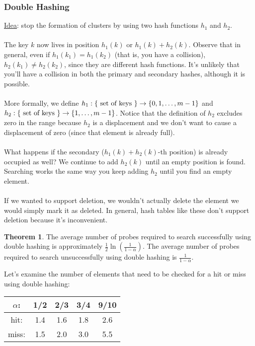 \documentclass[]{article}
\theoremstyle{definition}
\newtheorem*{theorem}{Theorem}
\DeclarePairedDelimiter{\set}{\lbrace}{\rbrace}
\begin{document}
			\subsubsection{Double Hashing}
				\underline{Idea}: stop the formation of clusters by using two hash functions $h_1$ and $h_2$.
				\\ \\
				The key $k$ now lives in position $h_1(k)$ or $h_1(k) + h_2(k)$. Observe that in general, even if $h_1(k_1) = h_1(k_2)$ (that is, you have a collision), $h_2(k_1) \ne h_2(k_2)$, since they are different hash functions. It's unlikely that you'll have a collision in both the primary and secondary hashes, although it is possible.
				\\ \\
				More formally, we define $h_1: \set{\text{ set of keys }} \to \set{0, 1, \ldots, m - 1}$ and $h_2: \set{\text{ set of keys }} \to \set{1, \ldots, m - 1}$. Notice that the definition of $h_2$ excludes zero in the range because $h_2$ is a displacement and we don't want to cause a displacement of zero (since that element is already full).
				\\ \\
				What happens if the secondary ($h_1(k) + h_2(k)$-th position) is already occupied as well? We continue to add $h_2(k)$ until an empty position is found. Searching works the same way \textendash{} you keep adding $h_2$ until you find an empty element.
				\\ \\
				If we wanted to support deletion, we wouldn't actually delete the element \textendash{} we would simply mark it as deleted. In general, hash tables like these don't support deletion because it's inconvenient.
				\begin{theorem}
					The average number of probes required to search successfully using double hashing is approximately $\frac{1}{2} \ln \left( \frac{1}{1 - \alpha} \right)$. The average number of probes required to search unsuccessfully using double hashing is $\frac{1}{1 - \alpha}$.
				\end{theorem}

				Let's examine the number of elements that need to be checked for a hit or miss using double hashing:
				\begin{center}
					\begin{tabular}{c|c|c|c|c}
						$\alpha$: & 1/2 & 2/3 & 3/4 & 9/10 \\ \hline
						hit: & 1.4 & 1.6 & 1.8 & 2.6 \\
						miss: & 1.5 & 2.0 & 3.0 & 5.5
					\end{tabular}
				\end{center}
\end{document}

